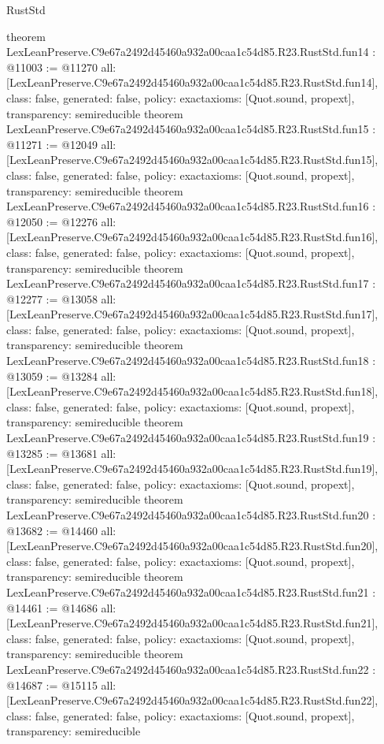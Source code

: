 \begin{lexlean}{RustStd}
\begin{coremodule}
{}
theorem LexLeanPreserve.C9e67a2492d45460a932a00caa1c54d85.R23.RustStd.fun14 : @11003 := @11270 {
  all: [LexLeanPreserve.C9e67a2492d45460a932a00caa1c54d85.R23.RustStd.fun14],
  class: false,
  generated: false,
  policy: exact{axioms: [Quot.sound, propext]},
  transparency: semireducible
}
theorem LexLeanPreserve.C9e67a2492d45460a932a00caa1c54d85.R23.RustStd.fun15 : @11271 := @12049 {
  all: [LexLeanPreserve.C9e67a2492d45460a932a00caa1c54d85.R23.RustStd.fun15],
  class: false,
  generated: false,
  policy: exact{axioms: [Quot.sound, propext]},
  transparency: semireducible
}
theorem LexLeanPreserve.C9e67a2492d45460a932a00caa1c54d85.R23.RustStd.fun16 : @12050 := @12276 {
  all: [LexLeanPreserve.C9e67a2492d45460a932a00caa1c54d85.R23.RustStd.fun16],
  class: false,
  generated: false,
  policy: exact{axioms: [Quot.sound, propext]},
  transparency: semireducible
}
theorem LexLeanPreserve.C9e67a2492d45460a932a00caa1c54d85.R23.RustStd.fun17 : @12277 := @13058 {
  all: [LexLeanPreserve.C9e67a2492d45460a932a00caa1c54d85.R23.RustStd.fun17],
  class: false,
  generated: false,
  policy: exact{axioms: [Quot.sound, propext]},
  transparency: semireducible
}
theorem LexLeanPreserve.C9e67a2492d45460a932a00caa1c54d85.R23.RustStd.fun18 : @13059 := @13284 {
  all: [LexLeanPreserve.C9e67a2492d45460a932a00caa1c54d85.R23.RustStd.fun18],
  class: false,
  generated: false,
  policy: exact{axioms: [Quot.sound, propext]},
  transparency: semireducible
}
theorem LexLeanPreserve.C9e67a2492d45460a932a00caa1c54d85.R23.RustStd.fun19 : @13285 := @13681 {
  all: [LexLeanPreserve.C9e67a2492d45460a932a00caa1c54d85.R23.RustStd.fun19],
  class: false,
  generated: false,
  policy: exact{axioms: [Quot.sound, propext]},
  transparency: semireducible
}
theorem LexLeanPreserve.C9e67a2492d45460a932a00caa1c54d85.R23.RustStd.fun20 : @13682 := @14460 {
  all: [LexLeanPreserve.C9e67a2492d45460a932a00caa1c54d85.R23.RustStd.fun20],
  class: false,
  generated: false,
  policy: exact{axioms: [Quot.sound, propext]},
  transparency: semireducible
}
theorem LexLeanPreserve.C9e67a2492d45460a932a00caa1c54d85.R23.RustStd.fun21 : @14461 := @14686 {
  all: [LexLeanPreserve.C9e67a2492d45460a932a00caa1c54d85.R23.RustStd.fun21],
  class: false,
  generated: false,
  policy: exact{axioms: [Quot.sound, propext]},
  transparency: semireducible
}
theorem LexLeanPreserve.C9e67a2492d45460a932a00caa1c54d85.R23.RustStd.fun22 : @14687 := @15115 {
  all: [LexLeanPreserve.C9e67a2492d45460a932a00caa1c54d85.R23.RustStd.fun22],
  class: false,
  generated: false,
  policy: exact{axioms: [Quot.sound, propext]},
  transparency: semireducible
}
\end{coremodule}
\end{lexlean}
